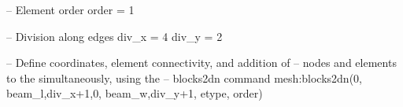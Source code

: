 -- Element order
order  =  1

-- Division along edges
div_x  =  4
div_y  =  2

-- Define coordinates, element connectivity, and addition of
-- nodes and elements to the simultaneously, using the
-- blocks2dn command
mesh:blocks2dn({0, beam_l},{div_x+1},{0, beam_w},{div_y+1}, etype, order)
